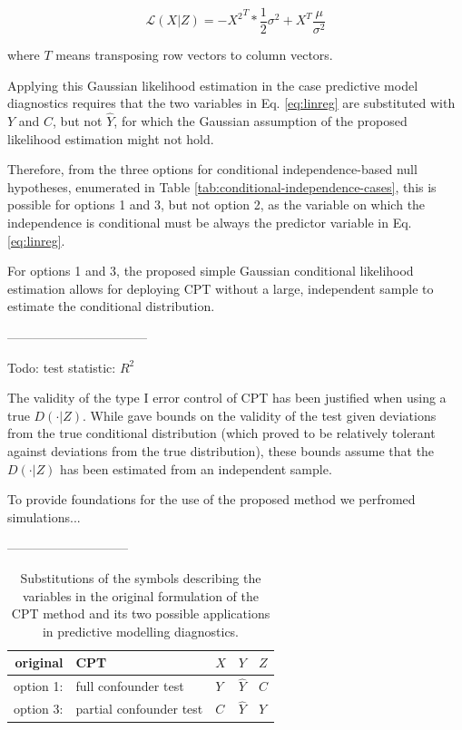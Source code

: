\documentclass{article}
\theoremstyle{definition}
\begin{document}
$$ \mathcal{L}(X|Z) = -{X^2}^T * \frac{1}{2} \sigma^2 + X^T \frac{\mu}{\sigma^2}$$

where $T$ means transposing row vectors to column vectors. 

Applying this Gaussian likelihood estimation in the case predictive model diagnostics requires that the two variables in Eq. \ref{eq:linreg} are substituted with $Y$ and $C$, but not $\hat{Y}$, for which the Gaussian assumption of the proposed likelihood estimation might not hold.

Therefore, from the three options for conditional independence-based null hypotheses, enumerated in Table \ref{tab:conditional-independence-cases}, this is possible for options 1 and 3, but not option 2, as the variable on which the independence is conditional must be always the predictor variable in Eq. \ref{eq:linreg}.

For options 1 and 3, the proposed simple Gaussian conditional likelihood estimation allows for deploying CPT without a large, independent sample to estimate the conditional distribution. 

---------------------------------


Todo: test statistic: $R^2$

The validity of the type I error control of CPT has been justified when using a true $D(\cdot|Z)$. While \cite{berrett2020conditional} gave bounds on the validity of the test given deviations from the true conditional distribution (which proved to be relatively tolerant against deviations from the true distribution), these bounds assume that the $D(\cdot|Z)$ has been estimated from an independent sample.

To provide foundations for the use of the proposed method we perfromed simulations...


-----------------------------

\renewcommand{\arraystretch}{2}
\begin{table}[]
\centering
\begin{tabular}{rl|l|l|l}
original & CPT & $X$ & $Y$ & $Z$ \\
\hline
option 1: & full confounder test & $Y$ & $\hat{Y}$ & $C$ \\
option 3: & partial confounder test & $C$ & $\hat{Y}$ & $Y$ \\
\end{tabular}
\caption{\label{tab:substitution} Substitutions of the symbols describing the variables in the original formulation of the CPT method and its two possible applications in predictive modelling diagnostics. }
\end{table}
\end{document}

